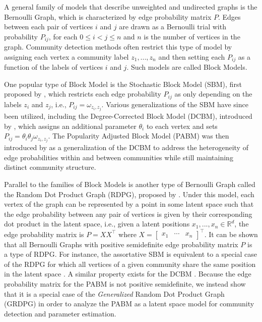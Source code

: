 \documentclass[12pt]{article}
\begin{document}
A general family of models that describe unweighted and undirected graphs is the Bernoulli Graph, which is characterized by edge probability matrix $P$. Edges between each pair of vertices $i$ and $j$ are drawn as a Bernoulli trial with probability $P_{ij}$, for each $0 \leq i < j \leq n$ and $n$ is the number of vertices in the graph. Community detection methods often restrict this type of model by assigning each vertex a community label $z_1, ..., z_n$ and then setting each $P_{ij}$ as a function of the labels of vertices $i$ and $j$. Such models are called Block Models. 

One popular type of Block Model is the Stochastic Block Model (SBM),
first proposed by \citet{doi:10.1080/0022250X.1971.9989788}, 
which restricts each edge probability $P_{ij}$ as only depending on the labels 
$z_i$ and $z_j$, i.e., $P_{ij} = \omega_{z_i, z_j}$. 
Various generalizations of the SBM have since been utilized, 
including the Degree-Corrected Block Model (DCBM), 
introduced by \citet{Karrer_2011}, 
which assigns an additional parameter $\theta_i$ to each vertex 
and sets $P_{ij} = \theta_i \theta_j \omega_{z_i, z_j}$. 
The Popularity Adjusted Block Model (PABM) was then introduced by
\citet*{307cbeb9b1be48299388437423d94bf1} as a generalization of the
DCBM to address the heterogeneity of edge probabilities within and
between communities while still maintaining distinct community
structure.

Parallel to the families of Block Models is another type of Bernoulli Graph 
called the Random Dot Product Graph (RDPG), proposed by
\citet*{10.1007/978-3-540-77004-6_11}. Under this model, each vertex of the graph
can be represented by a point in some latent space such that the edge
probability between any pair of vertices is given by their corresponding
dot product in the latent space, i.e., given a latent positions
\(x_1, ..., x_n \in \mathbb{R}^d\), the edge probability matrix is
\(P = X X^\top\) where 
\(X = \begin{bmatrix} x_1 & \cdots & x_n \end{bmatrix}^\top\). 
It can be shown that all Bernoulli Graphs with 
positive semidefinite edge probability matrix $P$ is a type of RDPG. 
For instance, the assortative
SBM is equivalent to a special case of the RDPG for which all vertices
of a given community share the same position in the latent space
\cite{lyzinski2014}. A similar property exists for the DCBM
\cite{lyzinski2014, rubindelanchy2017consistency}. 
Because the edge probability matrix for the PABM is not positive semidefinite, 
we instead show that it is a special case of the \emph{Generalized} Random Dot Product Graph (GRDPG) in order to analyze the PABM as a latent space model for community detection and parameter estimation. 
\end{document}

